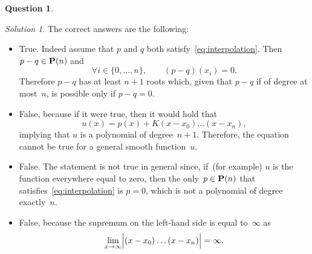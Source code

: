 \documentclass[11pt]{article}
\theoremstyle{definition}
\newtheorem{question}{Question}
\theoremstyle{remark}
\newtheorem*{protosolution}{Solution}
\newenvironment{solutionframe}
{%
    \begin{mdframed}[
        leftmargin=1cm,
        skipabove=.3cm,
        linecolor=blue,
        backgroundcolor=lightgreen,
        linewidth=0pt,
        innerleftmargin=.5em,
        innerrightmargin=.5em,
        innertopmargin=.3em,
        innerbottommargin=.6em,
    ]
}
{
    \end{mdframed}
}
\newenvironment{solution}
{\pushQED{\qed}\renewcommand{\qedsymbol}{$\triangle$}
\begin{solutionframe}\small \begin{protosolution}}
{\popQED\end{protosolution}\end{solutionframe}}
\begin{document}
\begin{question}
\begin{enumerate}
\begin{itemize}
            \end{itemize}
            \begin{solution}
                The correct answers are the following:
                \begin{itemize}
                    \item
                        True. Indeed assume that $p$ and $q$ both satisfy~\eqref{eq:interpolation}.
                        Then $p - q \in \mathbf P(n)$ and
                        \[
                            \forall i \in \{0, \dotsc, n\}, \qquad
                            (p - q) (x_i) = 0.
                        \]
                        Therefore $p - q$ has at least $n+1$ roots which,
                        given that $p - q$ if of degree at most~$n$,
                        is possible only if $p - q = 0$.

                    \item
                        False, because if it were true,
                        then it would hold that
                        \[
                            u(x) = p(x) + K (x - x_0) \dotsc (x - x_n),
                        \]
                        implying that $u$ is a polynomial of degree~$n+1$.
                        Therefore, the equation cannot be true for a general smooth function~$u$.

                    \item
                        False.
                        The statement is not true in general since,
                        if~(for example) $u$ is  the function everywhere equal to zero,
                        then the only~$p \in \mathbf P(n)$ that satisfies~\eqref{eq:interpolation} is $p = 0$,
                        which is not a polynomial of degree exactly~$n$.

                    \item
                        False, because the supremum on the left-hand side is equal to~$\infty$
                        as
                        \[
                            \lim_{x \to \infty} \Bigl\lvert (x - x_0) \dotsc (x - x_n) \Bigr\rvert = \infty.
                        \]


\end{itemize}
\end{solution}
\end{enumerate}
\end{question}
\end{document}
